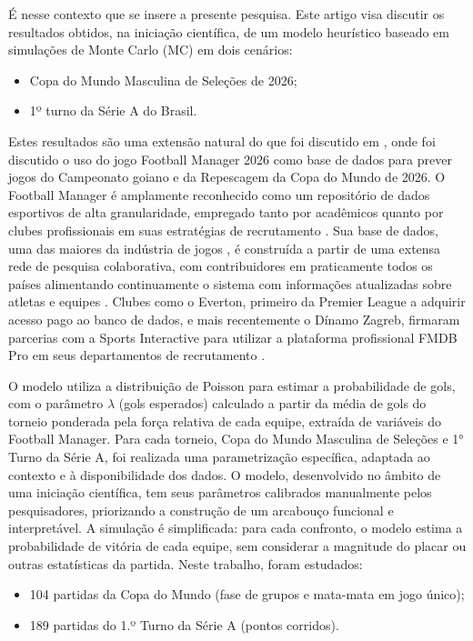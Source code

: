 \documentclass[12pt]{article}
\begin{document}
É nesse contexto que se insere a presente pesquisa. Este artigo visa discutir os resultados obtidos, na iniciação científica, de um modelo heurístico baseado em simulações de Monte Carlo (MC) em dois cenários: 
\begin{itemize}
	\item Copa do Mundo Masculina de Seleções de 2026;
	\item 1º turno da Série A do Brasil.
\end{itemize}
Estes resultados são uma extensão natural do que foi discutido em \cite{sbgames_estendido}, onde foi discutido o uso do jogo Football Manager 2026 \cite{fm2026} como base de dados para prever jogos do Campeonato goiano e da Repescagem da Copa do Mundo de 2026. O Football Manager é amplamente reconhecido como um repositório de dados esportivos de alta granularidade, empregado tanto por acadêmicos quanto por clubes profissionais em suas estratégias de recrutamento . Sua base de dados, uma das maiores da indústria de jogos , é construída a partir de uma extensa rede de pesquisa colaborativa, com contribuidores em praticamente todos os países alimentando continuamente o sistema com informações atualizadas sobre atletas e equipes . Clubes como o Everton, primeiro da Premier League a adquirir acesso pago ao banco de dados, e mais recentemente o Dínamo Zagreb, firmaram parcerias com a Sports Interactive para utilizar a plataforma profissional FMDB Pro em seus departamentos de recrutamento \cite{nogomania2025dinamo}. 

O modelo utiliza a distribuição de Poisson para estimar a probabilidade de gols, com o parâmetro $\lambda$ (gols esperados) calculado a partir da média de gols do torneio ponderada pela força relativa de cada equipe, extraída de variáveis do Football Manager. Para cada torneio, Copa do Mundo Masculina de Seleções e 1° Turno da Série A, foi realizada uma parametrização específica, adaptada ao contexto e à disponibilidade dos dados. O modelo, desenvolvido no âmbito de uma iniciação científica, tem seus parâmetros calibrados manualmente pelos pesquisadores, priorizando a construção de um arcabouço funcional e interpretável. A simulação é simplificada: para cada confronto, o modelo estima a probabilidade de vitória de cada equipe, sem considerar a magnitude do placar ou outras estatísticas da partida. Neste trabalho, foram estudados:

\begin{itemize}
	\item 104 partidas da Copa do Mundo (fase de grupos e mata-mata em jogo único);
	\item 189 partidas do 1.º Turno da Série A (pontos corridos).
\end{itemize}
\end{document}
